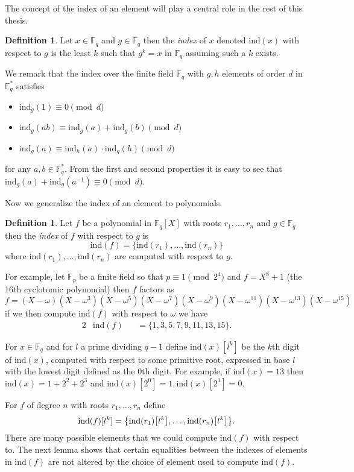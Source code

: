 \documentclass{article}
\let\originalleft\left
\let\originalright\right
\renewcommand{\left}{\mathopen{}\mathclose\bgroup\originalleft}
\renewcommand{\right}{\aftergroup\egroup\originalright}
\newcounter{dummy} \numberwithin{dummy}{section}
\theoremstyle{plain}
\theoremstyle{definition}
\newtheorem{mydef}[dummy]{Definition}
\def\Fp {{ \mathbb{F} _ {p} }}
\def\Fq {{ \mathbb{F} _ {q} }}
\def\FQ {{ \mathbb{F}^* _ {q} }}
\def\ind {{ \mathrm{ind} }}
\begin{document}
		The concept of the index of an element will play a central role in the rest of this thesis.
		\begin{mydef} 
		\label{DEF:IND}
		    Let $x \in \Fq$ and $g \in \Fq$ then the \emph{index} of $x$ denoted $\ind(x)$ with respect to $g$ is the least $k$ such that $g^k = x$ in $\Fq$ assuming such a $k$ exists.
		\end{mydef}
		
		We remark that the index over the finite field $\Fq$ with $g,h$ elements of order $d$ in $\FQ$ satisfies 
		\begin{itemize}
		    \item $\ind_g(1)  \equiv 0 \pmod {d}$
		    \item $\ind_g(ab) \equiv \ind_g(a)+\ind_g(b) \pmod {d}$
		    \item $\ind_g(a) \equiv \ind_h(a) \cdot \ind_g(h) \pmod {d}$
		\end{itemize}
		\noindent for any $a,b \in \FQ$. From the first and second properties it is easy to see that $\ind_g(a)+\ind_g(a^{-1}) \equiv 0 \pmod {d}$.
		
		Now we generalize the index of an element to polynomials. 
		\begin{mydef} 
		\label{DEF:INDF}
		    Let $f$ be a polynomial in $\Fq[X]$ with roots $r_1,\ldots,r_n$ and $g \in \Fq$ then the \emph{index} of $f$ with respect to $g$ is	
		    \[ \ind(f)=\{ \ind(r_1),\ldots,\ind(r_n)\} \] 
		    \noindent where $\ind(r_1),\ldots,\ind(r_n)$ are computed with respect to $g$. 
		\end{mydef} 
		For example, let $\Fp$ be a finite field so that $p \equiv 1 \pmod {2^4}$ and $f = X^8+1$ (the 16th cyclotomic polynomial) then $f$ factors as 
		    \[ f=(X-\omega)(X-\omega^3)(X-\omega^5)(X-\omega^7)(X-\omega^9)(X-\omega^{11})(X-\omega^{13})(X-\omega^{15}) \]
		if we then compute $\ind(f)$ with respect to $\omega$ we have 
		\begin{alignat*}{2}
		    &\ind(f) &&= \{1,3,5,7,9,11,13,15 \}. 
		\end{alignat*}
		
		For $x \in \Fq$ and for $l$ a prime dividing $q-1$ define $\ind(x)[l^k]$ be the $k$th digit of $\ind(x)$, computed with respect to some primitive root, expressed in base $l$ with the lowest digit defined as the 0th digit. For example, if $\ind(x)=13$ then $\ind(x)=1+2^2+2^3$ and $\ind(x)[2^0]=1,\ind(x)[2^1]=0.$ 
		 	
		For $f$ of degree $n$ with roots $r_1,\ldots,r_n$ define	
		    \[ \ind(f)[l^k]=\left\{ \ind(r_1) \left[l^k \right],\ldots,\ind(r_n)\left[l^k \right] \right\}. \] 
		There are many possible elements that we could compute $\ind(f)$ with respect to. The next lemma shows that certain equalities between the indexes of elements in $\ind(f)$ are not altered by the choice of element used to compute $\ind(f)$.  
		
\end{document}
